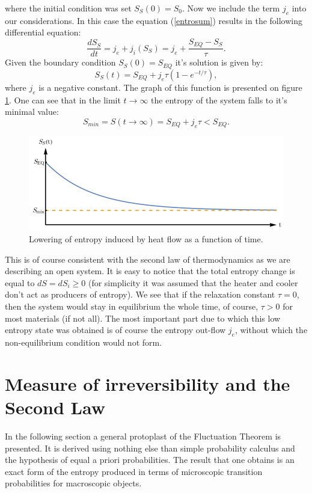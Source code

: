 \documentclass[a4paper,12pt]{article}
\begin{document}
where the initial condition was set $S_S(0)=S_0$. Now we include the term $j_e$ into our considerations.
In this case the equation (\ref{entrosum}) results in the following differential equation:
\begin{equation}
\frac{dS_S}{dt}=j_e + j_i\left(S_S\right)=j_e +\frac{S_{EQ}-S_S}{\tau}.
\label{dSSdt}
\end{equation} 
Given the boundary condition $S_S(0) =S_{EQ}$ it's solution is given by:
\begin{equation}
S_S(t)=S_{EQ}+j_e\tau \left(1-e^{-t/\tau }\right),
\end{equation} 
where $j_e$ is a negative constant. The graph of this function is presented on figure \ref{Fig3}. 
One can see that in the limit $t\rightarrow \infty$ the entropy of the system falls to it's minimal value:
\begin{equation}
S_{min}=S(t\rightarrow \infty) =S_{EQ}+j_e \tau < S_{EQ}.
\end{equation}

\begin{figure}[ht!]
\centering \includegraphics[width=12cm]{wykres3} 
\caption{Lowering of entropy induced by heat flow as a function of time.}
\label{Fig3} 
\end{figure}

This is of course consistent with the second law of thermodynamics as we are describing an open system.
It is easy to notice that the total entropy change is equal to $dS=dS_i \geq 0$ (for simplicity it was assumed that the heater and cooler don't act as producers of entropy).
We see that if the relaxation constant $\tau = 0$, then the system would stay in equilibrium the whole time, of course, $\tau > 0$ for most materials (if not all). The most important part due to which this low entropy state was obtained is of course the entropy out-flow $j_e$, without which the non-equilibrium condition would not form.

\section{Measure of irreversibility and the Second Law}
\label{IrreversibilityMeasureSection}
In the following section a general protoplast of the Fluctuation Theorem is presented. It is derived using nothing else than simple probability calculus and the hypothesis of equal a priori probabilities.
The result that one obtains is an exact form of the entropy produced in terms of microscopic transition probabilities for macroscopic objects.
\end{document}
